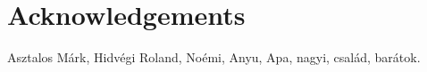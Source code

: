 \chapter*{Acknowledgements}
{}
\thispagestyle{plain}

Asztalos Márk, Hidvégi Roland, Noémi, Anyu, Apa, nagyi, család, barátok.

